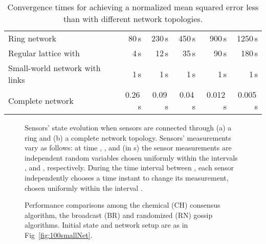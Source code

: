 \documentclass[journal]{IEEEtran}
\begin{document}
\begin{table*}
 \caption{{Convergence times for achieving a normalized mean squared error less than  with different network topologies.}}
 \centering\small
 \begin{tabular}{ | l | r r r r r  |} 
 \hline 
							& 	&   	&  	& 	 & 	
 \\ \hline 
 Ring	 network						&80{\,s}	 	& 230{\,s} 	& 450{\,s} 	& 900{\,s} 		& 1250{\,s}
  \\
Regular lattice with 				&4{\,s}	 & 12{\,s} 	& 35{\,s} 	& 90{\,s}	& 180{\,s} 	  	
 \\
  Small-world network with  links	 &1{\,s}	 	& 1{\,s}		 & 1{\,s} 	& 1{\,s}	 	& 1{\,s} 	
 \\ 
Complete network					&0.26{\,s}	 & 0.09{\,s} 	& 0.04{\,s} 	& 0.012{\,s} 	& 0.005{\,s} 	
 \\ 
 \hline 
 \end{tabular}
 \label{tabTime}
\end{table*}

\begin{figure}[t]
 \centering
\caption{{Sensors' state evolution when  sensors are connected through (a) a ring and (b) a complete network topology. Sensors' measurements vary as follows: at time , , and  (in s) the sensor measurements are independent random variables chosen uniformly within the intervals ,  and , respectively. During the time interval between , each sensor independently chooses a time instant to change its measurement, chosen uniformly within the interval .}}
\label{fig:simulFullRun}
\end{figure}


\begin{figure}[t]
 \centering
\caption{{Performance comparisons among the chemical (CH) consensus algorithm, the broadcast (BR) and randomized (RN) gossip algorithms. Initial state and network setup are as in Fig~\ref{fig:100smallNet}.}}
\label{fig:compImpl}
\end{figure}
\end{document}
